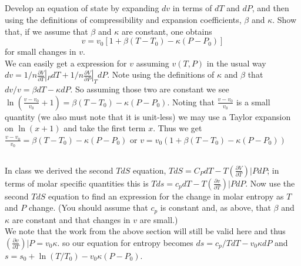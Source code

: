 \documentclass[10pt,a4paper]{article}
\begin{document}
\subsection{}
Develop an equation of state by expanding $dv$ in terms of $dT$ and $dP$, and then using the definitions of compressibility and expansion coefficients, $\beta$ and $\kappa$. Show that, if we assume that $\beta$ and $\kappa$ are constant, one obtains
$$v = v_0[1 + \beta(T - T_0) - \kappa(P - P_0)]$$
for small changes in $v$.\\
We can easily get a expression for $v$ assuming $v(T,P)$ in the usual way $dv=1/n\frac{\partial V}{\partial T}|_PdT+1/n\frac{\partial V}{\partial P}|_TdP$.  Note using the definitions of $\kappa$ and $\beta$ that $dv/v=\beta dT-\kappa dP$.  So assuming those two are constant we see $\ln(\frac{v-v_0}{v_0}+1)=\beta(T-T_0)-\kappa(P-P_0)$.  Noting that $\frac{v-v_0}{v_0}$ is a small quantity (we also must note that it is unit-less) we may use a Taylor expansion on $\ln(x+1)$ and take the first term $x$.  Thus we get $\frac{v-v_0}{v_0}=\beta(T-T_0)-\kappa(P-P_0)$ or $v=v_0(1+\beta(T-T_0)-\kappa(P-P_0))$
\subsection{}
In class we derived the second $T dS$ equation, $T dS = C_P dT - T(\frac{\partial V}{\partial T} )|P dP$; in terms of molar specific quantities this is $T ds = c_pdT - T(\frac{\partial v}{\partial T} )|P dP$. Now use the second $T dS$ equation to find an expression for the change in molar entropy as $T$ and $P$ change. (You should assume that $c_p$ is constant and, as above, that $\beta$ and $\kappa$ are constant and that changes in $v$ are small.)\\
We note that the work from the above section will still be valid here and thus $(\frac{\partial v}{\partial T} )|P=v_0\kappa$.  so our equation for entropy becomes $ds = c_p/TdT - v_0\kappa dP$ and $s=s_0+\ln(T/T_0)-v_0\kappa(P-P_0)$.
\end{document}
